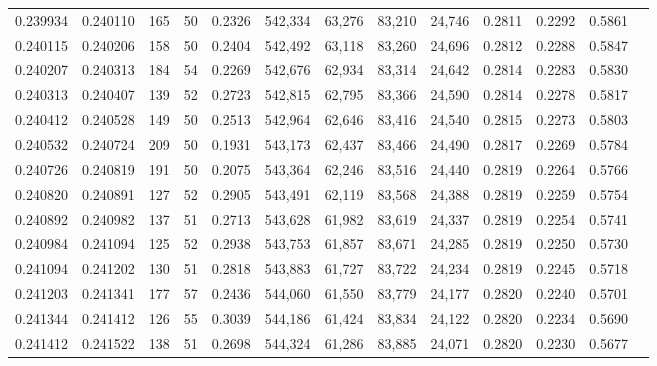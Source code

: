 \begin{tabular}{rrrrrrrrrrrrr}
0.239934 & 0.240110 &   165 &  50 &                                     0.2326 & 542,334 &  63,276 &  83,210 &  24,746 & 0.2811 & 0.2292 & 0.5861 \\
0.240115 & 0.240206 &   158 &  50 &                                     0.2404 & 542,492 &  63,118 &  83,260 &  24,696 & 0.2812 & 0.2288 & 0.5847 \\
0.240207 & 0.240313 &   184 &  54 &                                     0.2269 & 542,676 &  62,934 &  83,314 &  24,642 & 0.2814 & 0.2283 & 0.5830 \\
0.240313 & 0.240407 &   139 &  52 &                                     0.2723 & 542,815 &  62,795 &  83,366 &  24,590 & 0.2814 & 0.2278 & 0.5817 \\
0.240412 & 0.240528 &   149 &  50 &                                     0.2513 & 542,964 &  62,646 &  83,416 &  24,540 & 0.2815 & 0.2273 & 0.5803 \\
0.240532 & 0.240724 &   209 &  50 &                                     0.1931 & 543,173 &  62,437 &  83,466 &  24,490 & 0.2817 & 0.2269 & 0.5784 \\
0.240726 & 0.240819 &   191 &  50 &                                     0.2075 & 543,364 &  62,246 &  83,516 &  24,440 & 0.2819 & 0.2264 & 0.5766 \\
0.240820 & 0.240891 &   127 &  52 &                                     0.2905 & 543,491 &  62,119 &  83,568 &  24,388 & 0.2819 & 0.2259 & 0.5754 \\
0.240892 & 0.240982 &   137 &  51 &                                     0.2713 & 543,628 &  61,982 &  83,619 &  24,337 & 0.2819 & 0.2254 & 0.5741 \\
0.240984 & 0.241094 &   125 &  52 &                                     0.2938 & 543,753 &  61,857 &  83,671 &  24,285 & 0.2819 & 0.2250 & 0.5730 \\
0.241094 & 0.241202 &   130 &  51 &                                     0.2818 & 543,883 &  61,727 &  83,722 &  24,234 & 0.2819 & 0.2245 & 0.5718 \\
0.241203 & 0.241341 &   177 &  57 &                                     0.2436 & 544,060 &  61,550 &  83,779 &  24,177 & 0.2820 & 0.2240 & 0.5701 \\
0.241344 & 0.241412 &   126 &  55 &                                     0.3039 & 544,186 &  61,424 &  83,834 &  24,122 & 0.2820 & 0.2234 & 0.5690 \\
0.241412 & 0.241522 &   138 &  51 &                                     0.2698 & 544,324 &  61,286 &  83,885 &  24,071 & 0.2820 & 0.2230 & 0.5677 \\

\end{tabular}
